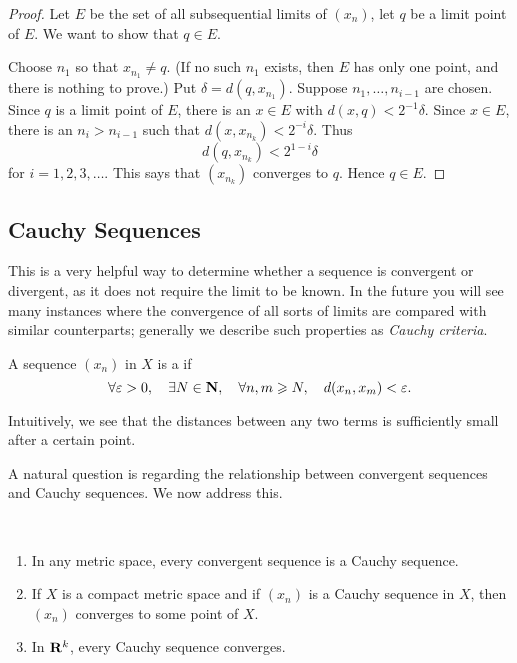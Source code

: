 \begin{proof}
Let $E$ be the set of all subsequential limits of $(x_n)$, let $q$ be a limit point of $E$. We want to show that $q\in E$.

Choose $n_1$ so that $x_{n_1}\neq q$. (If no such $n_1$ exists, then $E$ has only one point, and there is nothing to prove.) Put $\delta=d(q,x_{n_1})$. Suppose $n_1,\dots,n_{i-1}$ are chosen. Since $q$ is a limit point of $E$, there is an $x\in E$ with $d(x,q)<2^{-1}\delta$. Since $x\in E$, there is an $n_i>n_{i-1}$ such that $d(x,x_{n_k})<2^{-i}\delta$. Thus
\[d(q,x_{n_k})<2^{1-i}\delta\]
for $i=1,2,3,\dots$. This says that $(x_{n_k})$ converges to $q$. Hence $q\in E$.
\end{proof}

\subsection{Cauchy Sequences}
This is a very helpful way to determine whether a sequence is convergent or divergent, as it does not require the limit to be known. In the future you will see many instances where the convergence of all sorts of limits are compared with similar counterparts; generally we describe such properties as \emph{Cauchy criteria}.

\begin{definition}
A sequence $(x_n)$ in $X$ is a  if 
\[\forall\varepsilon>0,\quad\exists N\in\mathbf N,\quad\forall n,m\geqslant N,\quad d(x_n,x_m)<\varepsilon.\]
\end{definition}

\begin{remark}
Intuitively, we see that the distances between any two terms is sufficiently small after a certain point.
\end{remark}

A natural question is regarding the relationship between convergent sequences and Cauchy sequences. We now address this.

\begin{proposition} \
\begin{enumerate}[label=(\roman*)]
\item In any metric space, every convergent sequence is a Cauchy sequence.
\item If $X$ is a compact metric space and if $(x_n)$ is a Cauchy sequence in $X$, then $(x_n)$ converges to some point of $X$.
\item In $\mathbf R^k$, every Cauchy sequence converges. 
\end{enumerate}
\end{proposition}

